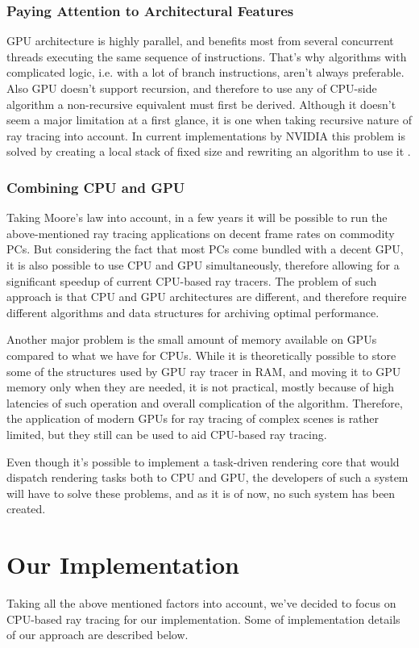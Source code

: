 \documentclass{article}
\begin{document}
\subsubsection{Paying Attention to Architectural Features}
GPU architecture is highly parallel, and benefits most from several concurrent threads executing the same sequence of instructions. That's why algorithms with complicated logic, i.e. with a lot of branch instructions, aren't always preferable. Also GPU doesn't support recursion, and therefore to use any of CPU-side algorithm a non-recursive equivalent must first be derived. Although it doesn't seem a major limitation at a first glance, it is one when taking recursive nature of ray tracing into account. In current implementations by NVIDIA this problem is solved by creating a local stack of fixed size and rewriting an algorithm to use it \cite{luebke08}.

\subsubsection{Combining CPU and GPU}
Taking Moore's law into account, in a few years it will be possible to run the above-mentioned ray tracing applications on decent frame rates on commodity PCs. But considering the fact that most PCs come bundled with a decent GPU, it is also possible to use CPU and GPU simultaneously, therefore allowing for a significant speedup of current CPU-based ray tracers. The problem of such approach is that CPU and GPU architectures are different, and therefore require different algorithms and data structures for archiving optimal performance.

Another major problem is the small amount of memory available on GPUs compared to what we have for CPUs. While it is theoretically possible to store some of the structures used by GPU ray tracer in RAM, and moving it to GPU memory only when they are needed, it is not practical, mostly because of high latencies of such operation and overall complication of the algorithm. Therefore, the application of modern GPUs for ray tracing of complex scenes is rather limited, but they still can be used to aid CPU-based ray tracing.

Even though it's possible to implement a task-driven rendering core that would dispatch rendering tasks both to CPU and GPU, the developers of such a system will have to solve these problems, and as it is of now, no such system has been created.


\newpage
\section{Our Implementation}
Taking all the above mentioned factors into account, we've decided to focus on CPU-based ray tracing for our implementation. Some of implementation details of our approach are described below.
\end{document}
